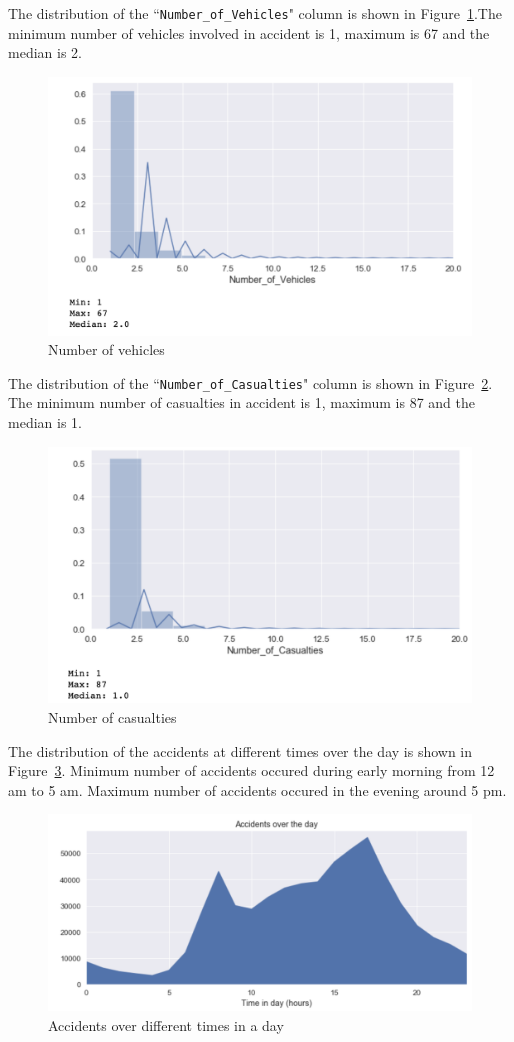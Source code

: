 \documentclass[12pt]{article}
\begin{document}
The distribution of the ``\verb|Number_of_Vehicles|" column is shown in Figure~\ref{fig7}.The minimum number of vehicles involved in accident is 1, maximum is 67 and the median is 2.
\begin{figure}[h!]
\centering
\includegraphics[width=0.8\linewidth]{"./figs/fig7"}
\caption{Number of vehicles}
\label{fig7}
\end{figure}
The distribution of the ``\verb|Number_of_Casualties|" column is shown in Figure~\ref{fig8}. The minimum number of casualties in accident is 1, maximum is 87 and the median is 1.
\begin{figure}[h!]
\centering
\includegraphics[width=0.8\linewidth]{"./figs/fig8"}
\caption{Number of casualties}
\label{fig8}
\end{figure}
The distribution of the accidents at different times over the day is shown in Figure~\ref{fig9}. Minimum number of accidents occured during early morning from 12 am to 5 am. Maximum number of accidents occured in the evening around 5 pm.
\begin{figure}[h!]
\centering
\includegraphics[width=0.8\linewidth]{"./figs/fig9"}
\caption{Accidents over different times in a day}
\label{fig9}
\end{figure}
 
\end{document}
